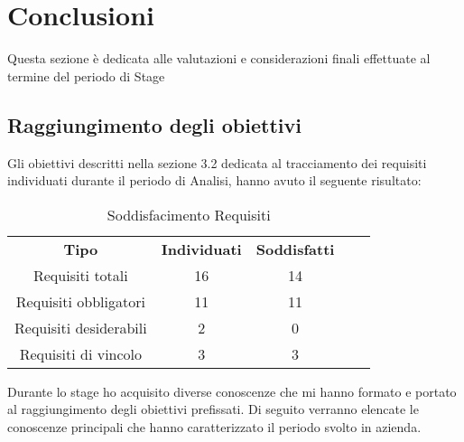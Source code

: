 
\chapter{Conclusioni}
\label{cap:conclusioni}
Questa sezione è dedicata alle valutazioni e considerazioni finali effettuate
al termine del periodo di Stage
\section{Raggiungimento degli obiettivi}
Gli obiettivi descritti nella sezione 3.2 dedicata al tracciamento dei requisiti
individuati durante il periodo di Analisi, hanno avuto il seguente risultato:
\begin{center}
	\begin{table}[h]
		\centering
		\begin{tabular}{|c|c|c|ll}
			\cline{1-3}
			\textbf{Tipo}          & \textbf{Individuati} & \textbf{Soddisfatti} &  &  \\ \cline{1-3}
			Requisiti totali       & 16                   & 14                   &  &  \\
			\cline{1-3}
			Requisiti obbligatori & 11                    & 11                    &  &  \\
			\cline{1-3}
			Requisiti desiderabili & 2                    & 0                    &  &  \\ \cline{1-3}
			Requisiti di vincolo   & 3                    & 3                    &  &  \\ \cline{1-3}
		\end{tabular}
	\caption{Soddisfacimento Requisiti}
	\end{table}
	\label{tab:Soddisfacimento Requisiti}

\end{center}
	Durante lo stage ho acquisito diverse conoscenze che mi hanno formato
e portato al raggiungimento degli obiettivi prefissati. Di seguito verranno
elencate le conoscenze principali che hanno caratterizzato il periodo svolto
in azienda.
